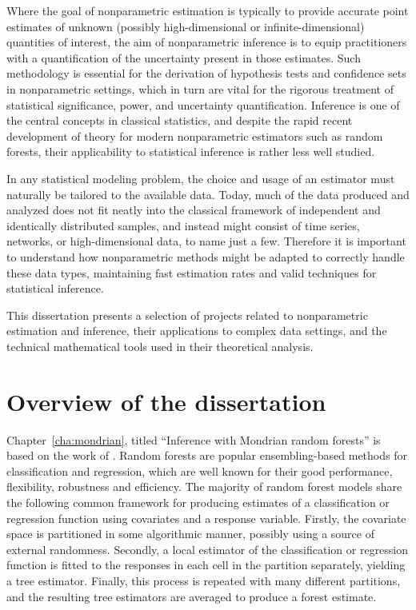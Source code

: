 Where the goal of nonparametric estimation is typically to provide accurate
point estimates of unknown (possibly high-dimensional or infinite-dimensional)
quantities of interest, the aim of nonparametric inference is to equip
practitioners with a quantification of the uncertainty present in those
estimates. Such methodology is essential for the derivation of hypothesis tests
and confidence sets in nonparametric settings, which in turn are vital for the
rigorous treatment of statistical significance, power, and uncertainty
quantification. Inference is one of the central concepts in classical
statistics, and despite the rapid recent development of theory for modern
nonparametric estimators such as random forests, their applicability to
statistical inference is rather less well studied.

In any statistical modeling problem, the choice and usage of an estimator must
naturally be tailored to the available data. Today, much of the data produced
and analyzed does not fit neatly into the classical framework of independent
and identically distributed samples, and instead might consist of time series,
networks, or high-dimensional data, to name just a few. Therefore it is
important to understand how nonparametric methods might be adapted to correctly
handle these data types, maintaining fast estimation rates and valid techniques
for statistical inference.

This dissertation presents a selection of projects related to nonparametric
estimation and inference, their applications to complex data settings, and the
technical mathematical tools used in their theoretical analysis.

\section*{Overview of the dissertation}

Chapter~\ref{cha:mondrian}, titled ``Inference with Mondrian random forests''
is based on the work of \cite{cattaneo2023inference}.
Random forests are popular ensembling-based methods for classification and
regression, which are well known for their good performance, flexibility,
robustness and efficiency. The majority of random forest models share the
following common framework for producing estimates of a classification or
regression function using covariates and a response variable. Firstly, the
covariate space is partitioned in some algorithmic manner, possibly using a
source of external randomness. Secondly, a local estimator of the
classification or regression function is fitted to the responses in each cell
in the partition separately, yielding a tree estimator. Finally, this process
is repeated with many different partitions, and the resulting tree estimators
are averaged to produce a forest estimate.

